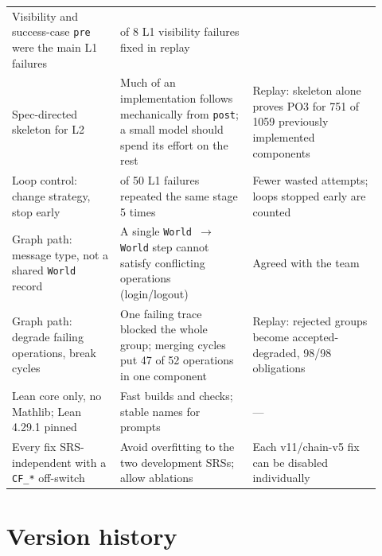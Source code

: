 \documentclass[11pt,a4paper]{article}
\newcommand{\code}[1]{\texttt{#1}}
\begin{document}
\begin{longtable}{>{\raggedright\arraybackslash}p{0.27\linewidth} >{\raggedright\arraybackslash}p{0.33\linewidth} >{\raggedright\arraybackslash}p{0.32\linewidth}}
Visibility and success-case \code{pre} were the main L1 failures &
7 of 8 L1 visibility failures fixed in replay \\
Spec-directed skeleton for L2 &
Much of an implementation follows mechanically from \code{post}; a small model should spend its effort on the rest &
Replay: skeleton alone proves PO3 for 751 of 1059 previously implemented components \\
Loop control: change strategy, stop early &
25 of 50 L1 failures repeated the same stage 5 times &
Fewer wasted attempts; loops stopped early are counted \\
Graph path: message type, not a shared \code{World} record &
A single \code{World $\to$ World} step cannot satisfy conflicting operations (login/logout) &
Agreed with the team \\
Graph path: degrade failing operations, break cycles &
One failing trace blocked the whole group; merging cycles put 47 of 52 operations in one component &
Replay: rejected groups become accepted-degraded, 98/98 obligations \\
Lean core only, no Mathlib; Lean 4.29.1 pinned &
Fast builds and checks; stable names for prompts & --- \\
Every fix SRS-independent with a \code{CF\_*} off-switch &
Avoid overfitting to the two development SRSs; allow ablations &
Each v11/chain-v5 fix can be disabled individually \\
\bottomrule
\end{longtable}
\normalsize

\section{Version history}
\end{document}
